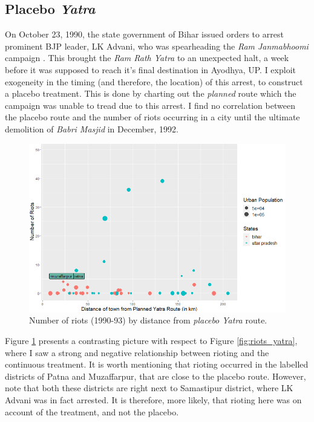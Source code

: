 \documentclass{article}
\begin{document}
\subsection{Placebo \textit{Yatra}}\label{strategy_placebo}
On October 23, 1990, the state government of Bihar issued orders to arrest prominent BJP leader, LK Advani, who was spearheading the \emph{Ram Janmabhoomi} campaign \citep{lalu}. This brought the \emph{Ram Rath Yatra} to an unexpected halt, a week before it was supposed to reach it's final destination in Ayodhya, UP. I exploit exogeneity in the timing (and therefore, the location) of this arrest, to construct a placebo treatment. This is done by charting out the \textit{planned} route which the campaign was unable to tread due to this arrest. I find no correlation between the placebo route and the number of riots occurring in a city until the ultimate demolition of \textit{Babri Masjid} in December, 1992. 

\begin{figure}[H]
    \centering
    \includegraphics[scale = 0.6]{images/graph_riots_yatra_p.png}
    \caption{Number of riots (1990-93) by distance from \textit{placebo Yatra} route.}
    \label{fig:riots_yatra_p}
\end{figure}

Figure \ref{fig:riots_yatra_p} presents a contrasting picture with respect to Figure \ref{fig:riots_yatra}, where I saw a strong and negative relationship between rioting and the continuous treatment. It is worth mentioning that rioting occurred in the labelled districts of Patna and Muzaffarpur, that are close to the placebo route. However, note that both these districts are right next to Samastipur district, where LK Advani was in fact arrested. It is therefore, more likely, that rioting here was on account of the treatment, and not the placebo.
\end{document}
